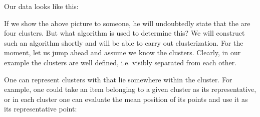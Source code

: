 \documentclass[letterpaper,10pt,english]{jupyterBook}
\begin{document}
\begin{sphinxVerbatim}[commandchars=\\\{\}]
\PYG{p}{[}    \PYG{p}{]}
\PYG{p}{[}    \PYG{p}{]}
\PYG{p}{[}    \PYG{p}{]}
\PYG{p}{[}    \PYG{p}{]}
\end{sphinxVerbatim}

\sphinxAtStartPar
Our data looks like this:

\noindent{}

\sphinxAtStartPar
If we show the above picture to someone, he will undoubtedly state that the are four clusters. But what algorithm is used to determine this? We will construct such an algorithm shortly and will be able to carry out clusterization. For the moment, let us jump ahead and assume we know the clusters. Clearly, in our example the clusters are well defined, i.e. visibly separated from each other.

\sphinxAtStartPar
One can represent clusters with  that lie somewhere within the cluster. For example, one could take an item belonging to a given cluster as its representative, or in each cluster one can evaluate the mean position of its points and use it as its representative point:
\end{document}
